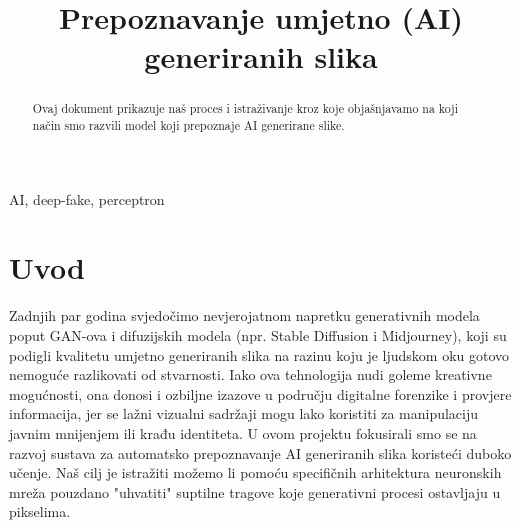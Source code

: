 \documentclass[conference]{IEEEtran}
\begin{document}
\title{Prepoznavanje umjetno (AI) generiranih slika\\}

\author{
\and
{}
\and
{}
\and
{}
}

\maketitle

\begin{abstract}
Ovaj dokument prikazuje naš proces i istraživanje kroz koje objašnjavamo na koji način
smo razvili model koji prepoznaje AI generirane slike.
\end{abstract}

\begin{IEEEkeywords}
AI, deep-fake, perceptron
\end{IEEEkeywords}

\section{Uvod}Zadnjih par godina svjedočimo nevjerojatnom napretku generativnih modela poput GAN-ova i difuzijskih modela (npr. Stable Diffusion i Midjourney), koji su podigli kvalitetu umjetno generiranih slika na razinu koju je ljudskom oku gotovo nemoguće razlikovati od stvarnosti. Iako ova tehnologija nudi goleme kreativne mogućnosti, ona donosi i ozbiljne izazove u području digitalne forenzike i provjere informacija, jer se lažni vizualni sadržaji mogu lako koristiti za manipulaciju javnim mnijenjem ili krađu identiteta. U ovom projektu fokusirali smo se na razvoj sustava za automatsko prepoznavanje AI generiranih slika koristeći duboko učenje. Naš cilj je istražiti možemo li pomoću specifičnih arhitektura neuronskih mreža pouzdano "uhvatiti" suptilne tragove koje generativni procesi ostavljaju u pikselima.
\end{document}
